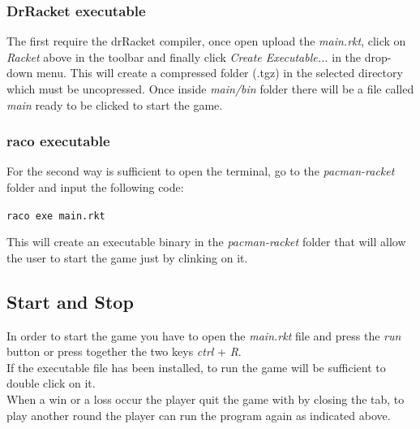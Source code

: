 \documentclass{article}
\begin{document}
\subsubsection{DrRacket executable}

The first require the drRacket compiler, once open upload the \textit{main.rkt}, click on \textit{Racket} above in the toolbar and finally click \textit{Create Executable...} in the drop-down menu. This will create a compressed folder (.tgz) in the selected directory which must be uncopressed. Once inside \textit{main/bin} folder there will be a file called \textit{main} ready to be clicked to start the game.

\subsubsection{raco executable}
For the second way is sufficient to open the terminal, go to the \textit{pacman-racket} folder and input the following code:
\begin{center}
 \texttt{raco exe main.rkt}
\end{center}

This will create an executable binary in the \textit{pacman-racket} folder that will allow the user to start the game just by clinking on it.

\subsection{Start and Stop}
In order to start the game you have to open the \textit{main.rkt} file and press the \textit{run} button or press together the two keys \textit{ctrl} + \textit{R}.\\
If the executable file has been installed, to run the game will be sufficient to double click on it. 
\\
When a win or a loss occur the player quit the game with by closing the tab, to play another round the player can run the program again as indicated above.

 
\end{document}
